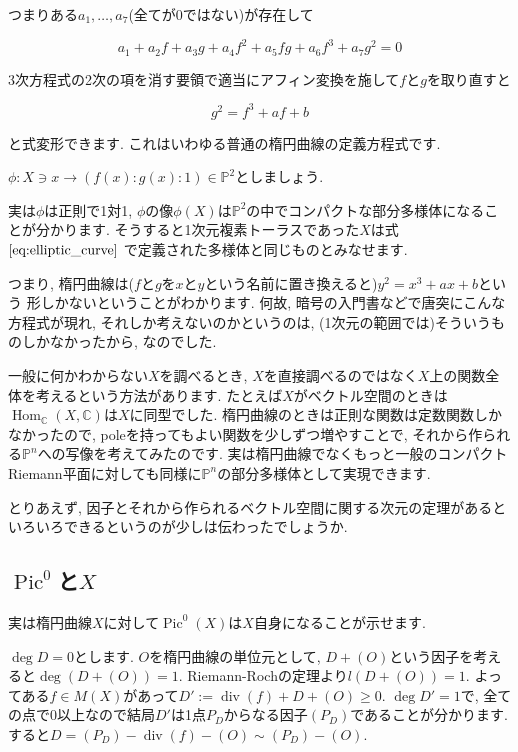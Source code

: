 \documentclass{jsarticle}
\newcommand{\CC}{\mathbb{C}}
\newcommand{\PP}{\mathbb{P}}
\newcommand{\makeop}[1]{\mathop{\mathrm{#1}}\nolimits}
\def\Hom{\makeop{Hom}}
\def\Pic{\makeop{Pic}}
\def\div{\makeop{div}}
\theoremstyle{definition}
\numberwithin{theorem}{section}
\begin{document}
つまりある$a_1, \ldots, a_7$(全てが0ではない)が存在して

\begin{equation*}
a_1 + a_2f + a_3g + a_4f^2+a_5fg+a_6f^3+a_7g^2 = 0
\end{equation*}

3次方程式の2次の項を消す要領で適当にアフィン変換を施して$f$と$g$を取り直すと

\begin{equation}
\label{eq:elliptic_curve}
g^2 = f^3 + af + b
\end{equation}

と式変形できます. これはいわゆる普通の楕円曲線の定義方程式です.

$\phi: X \ni x \rightarrow (f(x):g(x):1) \in \PP^2$としましょう.

実は$\phi$は正則で1対1, $\phi$の像$\phi(X)$は$\PP^2$の中でコンパクトな部分多様体になることが分かります. そうすると1次元複素トーラスであった$X$は式 $\ref{eq:elliptic_curve}$ で定義された多様体と同じものとみなせます.

つまり, 楕円曲線は($f$と$g$を$x$と$y$という名前に置き換えると)$y^2 = x^3+ax+b$という
形しかないということがわかります. 何故, 暗号の入門書などで唐突にこんな方程式が現れ, それしか考えないのかというのは, (1次元の範囲では)そういうものしかなかったから, なのでした.

一般に何かわからない$X$を調べるとき, $X$を直接調べるのではなく$X$上の関数全体を考えるという方法があります. たとえば$X$がベクトル空間のときは$\Hom_\CC(X, \CC)$は$X$に同型でした. 楕円曲線のときは正則な関数は定数関数しかなかったので, poleを持ってもよい関数を少しずつ増やすことで, それから作られる$\PP^n$への写像を考えてみたのです. 実は楕円曲線でなくもっと一般のコンパクトRiemann平面に対しても同様に$\PP^n$の部分多様体として実現できます.

とりあえず, 因子とそれから作られるベクトル空間に関する次元の定理があるといろいろできるというのが少しは伝わったでしょうか.

\subsection{$\Pic^0$と$X$}
実は楕円曲線$X$に対して$\Pic^0(X)$は$X$自身になることが示せます.

$\deg D = 0$とします. $O$を楕円曲線の単位元として, $D + (O)$という因子を考えると$\deg(D + (O)) = 1$. Riemann-Rochの定理より$l(D + (O)) = 1$. よってある$f \in M(X)$があって$D' := \div(f) + D + (O) \geq 0$. $\deg D' = 1$で, 全ての点で0以上なので結局$D'$は1点$P_D$からなる因子$(P_D)$であることが分かります. すると$D = (P_D) - \div(f) - (O) \sim (P_D) - (O)$.
\end{document}
